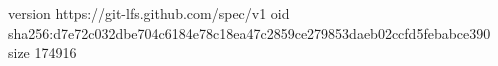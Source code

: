 version https://git-lfs.github.com/spec/v1
oid sha256:d7e72c032dbe704c6184e78c18ea47c2859ce279853daeb02ccfd5febabce390
size 174916
